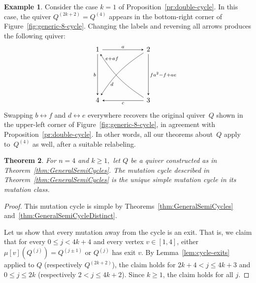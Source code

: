 \documentclass[11pt, letterpaper]{amsart}
\newtheorem{theorem}{Theorem}[section]
\theoremstyle{definition}
\newtheorem{example}[theorem]{Example}
\numberwithin{equation}{section}
\newcommand{\T}[2]{\mu[#1](#2)} %
\begin{document}
\begin{example}
Consider the case $k=1$ of Proposition~\ref{pr:double-cycle}. 
In this case, the quiver $Q^{(2k+2)}=Q^{(4)}$ appears in the bottom-right corner of Figure~\ref{fig:generic-8-cycle}. 
Changing the labels and reversing all arrows produces the following quiver:
\begin{equation*}
\qquad 
\begin{tikzcd}[arrows={-stealth}, sep=6em]
  1  \arrow[r,  "a"]
  & 2  \arrow[d,  "fa^2-f+ae"]
  \\
   4 \arrow[ur, "d", swap, bend left=12, near start, outer sep=-1.8, stealth-] \arrow[u, "b", stealth-] \arrow[r, "c", swap, stealth-]  
   & 3  \arrow[ul, "e+af", swap, bend left=12, very near end, outer sep=-1.8]
\end{tikzcd}
\end{equation*}
Swapping $b\leftrightarrow f$ and $d\leftrightarrow e$ everywhere recovers the original quiver~$Q$
shown in the upper-left corner of Figure~\ref{fig:generic-8-cycle}, in agreement with Proposition~\ref{pr:double-cycle}. 
In other words, all our theorems about~$Q$ apply to~$Q^{(4)}$ as well, after a suitable relabeling. 
\end{example}

\begin{theorem}
For $n=4$ and $k \geq 1,$ let $Q$ be a quiver constructed as in Theorem~\ref{thm:GeneralSemiCycles}. The mutation cycle described in Theorem~\ref{thm:GeneralSemiCycles} is the unique simple mutation cycle in its mutation class.
\end{theorem}

\begin{proof}
This mutation cycle is simple by Theorems~\ref{thm:GeneralSemiCycles} and~\ref{thm:GeneralSemiCycleDistinct}.

Let us show that every mutation away from the cycle is an exit. 
That is, we claim that for every $0 \leq j < 4k+4$ and every vertex $v \in [1,4]$, 
either $\T{v}{Q^{(j)}} = Q^{(j\pm1)}$ or $Q^{(j)}$ has exit $v$.
By Lemma~\ref{lem:cycle-exits} applied to $Q$ (respectively $Q^{(2k+2)}$), the claim holds for $2k+4 < j \leq 4k+3$ and $0 \leq j \leq 2k$ (respectively $2 < j \leq 4k+2$).
Since $k \ge 1$, the claim holds for all $j$.
\end{proof}


\newpage
\end{document}
